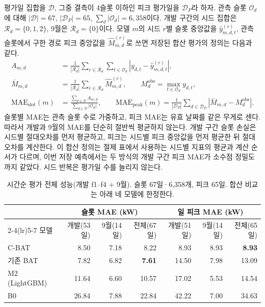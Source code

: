 평가일 집합을 $\mathcal D$, 그중 결측이 4슬롯 이하인 피크 평가일을 $\mathcal D_P$라 하자. 관측 슬롯 $\mathcal O_d$에 대해 $|\mathcal D|=67$, $|\mathcal D_P|=65$, $\sum_d|\mathcal O_d|=6{,}358$이다. 개발 구간의 시드 집합은 $\mathcal R_d=\{0,1,2\}$, 9월은 $\mathcal R_d=\{0\}$이다. 모델 $m$의 시드 $r$별 슬롯 중앙값을 $\hat y^{(r)}_{m,d,t}$, 관측 슬롯에서 구한 경로 피크 중앙값을 $\hat M^{(r)}_{m,d}$로 쓰면 저장된 합산 평가의 정의는 다음과 같다.
\begin{align}
A_{m,d} &= \frac1{|\mathcal R_d|}\sum_{r\in\mathcal R_d}
\sum_{t\in\mathcal O_d}|y_{d,t}-\hat y^{(r)}_{m,d,t}|,\\
\bar M_{m,d} &= \frac1{|\mathcal R_d|}\sum_{r\in\mathcal R_d}\hat M^{(r)}_{m,d},\qquad
M^{\mathrm{obs}}_d=\max_{t\in\mathcal O_d}y_{d,t},\\
\mathrm{MAE}_{\mathrm{slot}}(m) &= \frac{\sum_{d\in\mathcal D}A_{m,d}}
{\sum_{d\in\mathcal D}|\mathcal O_d|},\qquad
\mathrm{MAE}_{\mathrm{peak}}(m)=\frac1{|\mathcal D_P|}
\sum_{d\in\mathcal D_P}|\bar M_{m,d}-M^{\mathrm{obs}}_d|.
\label{eq:ch4-pooled-mae}
\end{align}
슬롯별 MAE는 관측 슬롯 수로 가중하고, 피크 MAE는 유효 날짜를 같은 무게로 센다. 따라서 개발과 9월의 MAE를 단순히 절반씩 평균하지 않는다. 개발 구간 슬롯 손실은 시드별 절대오차를 먼저 평균하고, 피크는 시드별 피크 중앙값을 먼저 평균한 뒤 절대오차를 계산한다. 이 합산 정의는 절제 표에서 사용하는 시드별 지표의 평균과 계산 순서가 다르며, 이번 저장 예측에서는 두 방식의 개발 구간 피크 MAE가 소수점 정밀도까지 같았다. 시드 반복은 평가일 수를 늘리지 않는다.

\begin{table}[htbp]
\centering
\caption{시간순 평가 전체 성능(개발 f1--f4 + 9월). 슬롯 67일·6,358개, 피크 65일. 합산 비교는 아래 네 모델에 한정한다.}
\label{tab:ch4-pooled}
\small
\begin{tabular}{lrrrrrr}
\toprule
& \multicolumn{3}{c}{슬롯 MAE (kW)} & \multicolumn{3}{c}{일 피크 MAE (kW)} \\
\cmidrule(lr){2-4}\cmidrule(lr){5-7}
모델 & 개발(53일) & 9월(14일) & 전체(67일) & 개발(51일) & 9월(14일) & 전체(65일) \\
\midrule
C-BAT & 8.50 & 7.18 & 8.22 & 8.93 & 8.93 & \textbf{8.93} \\
기존 BAT & 7.82 & 6.82 & \textbf{7.61} & 14.50 & 7.98 & 13.09 \\
M2 (LightGBM) & 11.64 & 6.60 & 10.57 & 17.02 & 5.53 & 14.54 \\
B0 & 26.84 & 7.88 & 22.84 & 42.22 & 7.00 & 34.63 \\
\bottomrule
\end{tabular}
\end{table}

